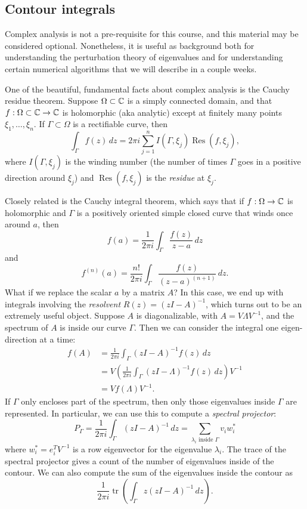 \documentclass[12pt, leqno]{article} %
\begin{document}
\subsection{Contour integrals}

Complex analysis is not a pre-requisite for this course, and this
material may be considered optional.  Nonetheless, it is useful as
background both for understanding the perturbation theory of
eigenvalues and for understanding certain numerical algorithms that we
will describe in a couple weeks.

One of the beautiful, fundamental facts about complex analysis is the
Cauchy residue theorem.  Suppose $\Omega \subset \mathbb{C}$ is a simply
connected domain, and that $f : \Omega \subset \mathbb{C} \rightarrow \mathbb{C}$
is holomorphic (aka analytic) except at finitely many points $\xi_1,
\ldots, \xi_n$.  If $\Gamma \subset \Omega$ is a rectifiable curve,
then
\[
  \int_\Gamma f(z) \, dz = 2 \pi i \sum_{j=1}^n I(\Gamma, \xi_j)
  \operatorname{Res}(f, \xi_j),
\]
where $I(\Gamma, \xi_j)$ is the winding number (the number of times
$\Gamma$ goes in a positive direction around $\xi_j$) and
$\operatorname{Res}(f, \xi_j)$ is the {\em residue} at $\xi_j$.

Closely related is the Cauchy integral theorem, which says that if
$f : \Omega \rightarrow \mathbb{C}$ is holomorphic and $\Gamma$ is a
positively oriented simple closed curve that winds once around $a$, then
\[
  f(a) = \frac{1}{2\pi i} \int_\Gamma \frac{f(z)}{z-a} \, dz
\]
and
\[
  f^{(n)}(a) = \frac{n!}{2\pi i} \int_\Gamma
  \frac{f(z)}{(z-a)^{(n+1)}} \, dz.
\]
What if we replace the scalar $a$ by a matrix $A$?  In this case, we
end up with integrals involving the {\em resolvent} $R(z) =
(zI-A)^{-1}$, which turns out to be an extremely useful object.
Suppose $A$ is diagonalizable, with $A = V \Lambda V^{-1}$, and the
spectrum of $A$ is inside our curve $\Gamma$.  Then we can consider
the integral one eigen-direction at a time:
\begin{align*}
f(A) &= \frac{1}{2\pi i} \int_{\Gamma} (zI-A)^{-1} f(z) \, dz \\
     &= V \left( \frac{1}{2\pi i} \int_\Gamma (zI-\Lambda)^{-1} f(z) \,
     dz \right) V^{-1} \\
     &= V f(\Lambda) V^{-1}.
\end{align*}
If $\Gamma$ only encloses part of the spectrum, then only those
eigenvalues inside $\Gamma$ are represented.  In particular,
we can use this to compute a {\em spectral projector}:
\[
P_{\Gamma}
  = \frac{1}{2\pi i} \int_\Gamma (zI-A)^{-1} \, dz
  = \sum_{\lambda_i \mbox{ inside } \Gamma} v_i w_i^*
\]
where $w_i^* = e_i^T V^{-1}$ is a row eigenvector for the eigenvalue
$\lambda_i$.  The trace of the spectral projector gives a count of the
number of eigenvalues inside of the contour.  We can also compute the
sum of the eigenvalues inside the contour as
\[
  \frac{1}{2\pi i}
  \operatorname{tr} \left( \int_{\Gamma} z(zI-A)^{-1} \, dz \right).
  \]
  
\end{document}
